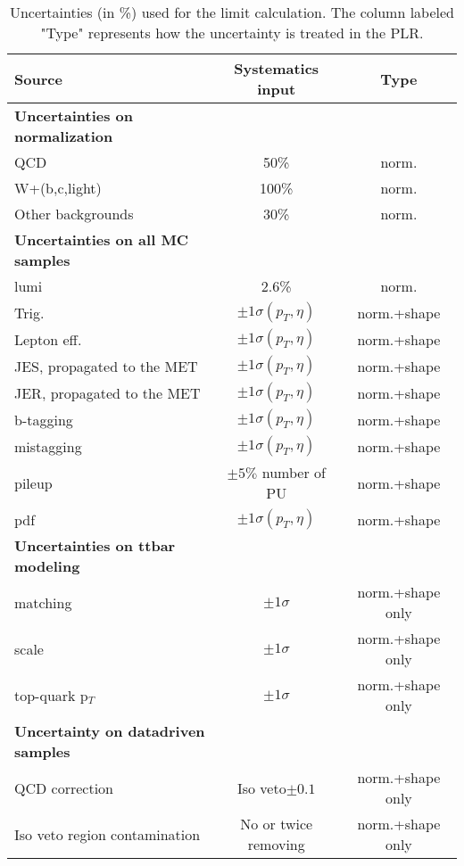 \documentclass[10pt]{article}
\begin{document}
\begin{table}[!ht]
\begin{center}
\begin{tabular}{|l|c|c|}
\hline
\hline
\textbf{Source} & \textbf{Systematics input } & \textbf{Type} \\
\hline
\hline
\textbf{Uncertainties on normalization} &  & \\
\hline
QCD                       & 50\% & norm.\\
W+(b,c,light)             & 100\%& norm.\\
Other backgrounds         & 30\%& norm.\\
\hline
\textbf{Uncertainties on all MC samples} &  & \\
\hline
lumi                     & 2.6\%    & norm.\\
Trig.                    & $\pm 1 \sigma(p_T, \eta)$  & norm.+shape\\
Lepton eff.              & $\pm 1 \sigma(p_T, \eta)$  & norm.+shape\\
JES, propagated to the MET                      & $\pm 1 \sigma(p_T, \eta)$  & norm.+shape\\
JER, propagated to the MET                      & $\pm 1 \sigma(p_T, \eta)$  & norm.+shape\\
b-tagging                & $\pm 1 \sigma(p_T, \eta)$  & norm.+shape\\
mistagging               & $\pm 1 \sigma(p_T, \eta)$  & norm.+shape\\
pileup                   & $\pm 5 \%$ number of PU & norm.+shape\\
pdf                      & $\pm 1 \sigma(p_T, \eta)$  & norm.+shape\\
\hline
\textbf{Uncertainties on ttbar modeling} & & \\
\hline
matching          & $\pm 1 \sigma$ & norm.+shape only\\
scale             & $\pm 1 \sigma$ & norm.+shape only\\
top-quark p$_T$   & $\pm 1 \sigma$ & norm.+shape only\\
\hline
\textbf{Uncertainty on datadriven samples} & & \\
\hline
QCD correction           & Iso veto$ \pm 0.1 $ & norm.+shape only\\
Iso veto region contamination           & No or twice removing  & norm.+shape only\\
\hline
\end{tabular}
\caption{Uncertainties (in \%) used for the limit calculation. The column labeled "Type" represents how the uncertainty is
treated in the PLR.}
\label{tab:systtable_PLR}
\end{center}
\end{table} 
\end{document}
